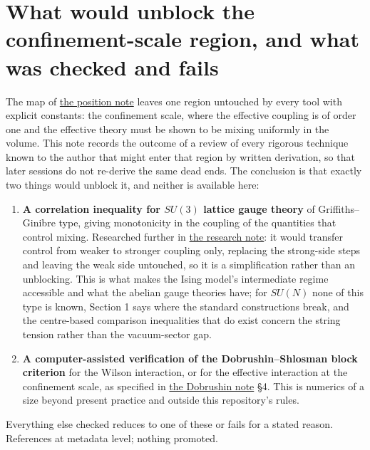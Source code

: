 \documentclass[11pt,a4paper]{article}
\newcommand{\tightlist}{\setlength{\itemsep}{0pt}\setlength{\parskip}{0pt}}
\begin{document}
\hypertarget{what-would-unblock-the-confinement-scale-region-and-what-was-checked-and-fails}{%
\section{What would unblock the confinement-scale region, and what was
checked and
fails}\label{what-would-unblock-the-confinement-scale-region-and-what-was-checked-and-fails}}

The map of \href{mass-gap-position.md}{the position note} leaves one
region untouched by every tool with explicit constants: the confinement
scale, where the effective coupling is of order one and the effective
theory must be shown to be mixing uniformly in the volume. This note
records the outcome of a review of every rigorous technique known to the
author that might enter that region by written derivation, so that later
sessions do not re-derive the same dead ends. The conclusion is that
exactly two things would unblock it, and neither is available here:

\begin{enumerate}
\def\labelenumi{\arabic{enumi}.}
\tightlist
\item
  \textbf{A correlation inequality for \(SU(3)\) lattice gauge theory}
  of Griffiths--Ginibre type, giving monotonicity in the coupling of the
  quantities that control mixing. Researched further in
  \href{reasons-to-stop-as-research.md}{the research note}: it would
  transfer control from weaker to stronger coupling only, replacing the
  strong-side steps and leaving the weak side untouched, so it is a
  simplification rather than an unblocking. This is what makes the Ising
  model's intermediate regime accessible and what the abelian gauge
  theories have; for \(SU(N)\) none of this type is known, Section 1
  says where the standard constructions break, and the centre-based
  comparison inequalities that do exist concern the string tension
  rather than the vacuum-sector gap.
\item
  \textbf{A computer-assisted verification of the Dobrushin--Shlosman
  block criterion} for the Wilson interaction, or for the effective
  interaction at the confinement scale, as specified in
  \href{dobrushin-uniqueness-wilson.md}{the Dobrushin note} §4. This is
  numerics of a size beyond present practice and outside this
  repository's rules.
\end{enumerate}

Everything else checked reduces to one of these or fails for a stated
reason. References at metadata level; nothing promoted.
\end{document}
